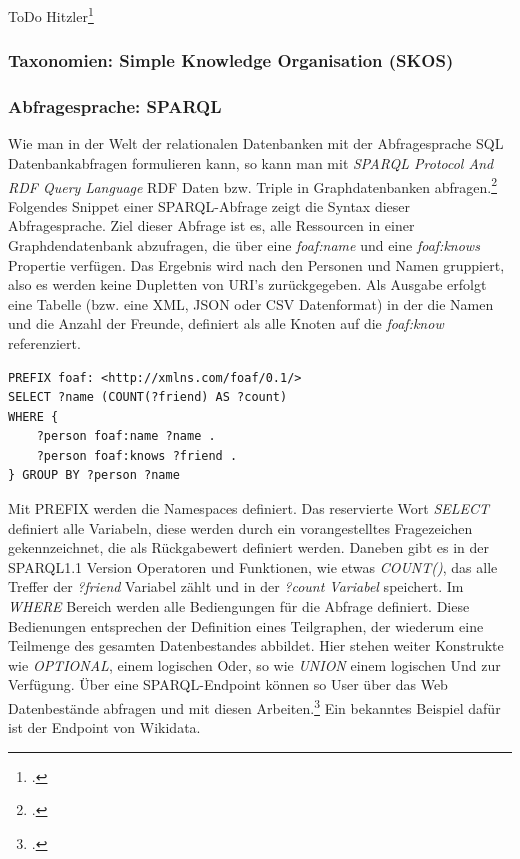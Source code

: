 \documentclass[12pt,a4paper]{article}
\begin{document}
ToDo Hitzler\footcite[][]{hitzler2007semantic} 

\subsubsection{Taxonomien: Simple Knowledge Organisation (SKOS)}


\subsubsection{Abfragesprache: SPARQL}
Wie man in der Welt der relationalen Datenbanken mit der Abfragesprache SQL Datenbankabfragen formulieren kann, so kann man mit \textit{SPARQL Protocol And RDF Query Language} RDF Daten bzw. Triple in Graphdatenbanken abfragen.\footcite[][]{w3c2013sparql}
\\
Folgendes Snippet einer SPARQL-Abfrage zeigt die Syntax dieser Abfragesprache. Ziel dieser Abfrage ist es, alle Ressourcen in einer Graphdendatenbank abzufragen, die über eine \textit{foaf:name} und eine \textit{foaf:knows} Propertie verfügen. Das Ergebnis wird nach den Personen und Namen gruppiert, also es werden keine Dupletten von URI's zurückgegeben. Als Ausgabe erfolgt eine Tabelle (bzw. eine XML, JSON oder CSV Datenformat) in der die Namen und die Anzahl der Freunde, definiert als alle Knoten auf die \textit{foaf:know} referenziert.
\begin{lstlisting}[]
PREFIX foaf: <http://xmlns.com/foaf/0.1/>
SELECT ?name (COUNT(?friend) AS ?count)
WHERE { 
    ?person foaf:name ?name . 
    ?person foaf:knows ?friend . 
} GROUP BY ?person ?name
\end{lstlisting}
Mit PREFIX werden die Namespaces definiert. Das reservierte Wort \textit{SELECT} definiert alle Variabeln, diese werden durch ein vorangestelltes Fragezeichen gekennzeichnet, die als Rückgabewert definiert werden. Daneben gibt es in der SPARQL1.1 Version Operatoren und Funktionen, wie etwas \textit{COUNT()}, das alle Treffer der \textit{?friend} Variabel zählt und in der \textit{?count Variabel} speichert. Im \textit{WHERE} Bereich werden alle Bediengungen für die Abfrage definiert. Diese Bedienungen entsprechen der Definition eines Teilgraphen, der wiederum eine Teilmenge des gesamten Datenbestandes abbildet. Hier stehen weiter Konstrukte wie \textit{OPTIONAL}, einem logischen Oder, so wie \textit{UNION} einem logischen Und zur Verfügung. Über eine SPARQL-Endpoint können so User über das Web Datenbestände abfragen und mit diesen Arbeiten.\footcite[][S.1-45]{ducharme2013learning}  Ein bekanntes Beispiel dafür ist der Endpoint von Wikidata.
\end{document}
